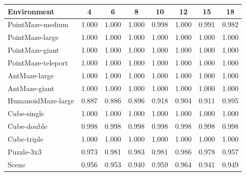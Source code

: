 \begin{tabular}{lccccccc}
\toprule
Environment & 4 & 6 & 8 & 10 & 12 & 15 & 18\\
\midrule
PointMaze-medium & 1.000 & 1.000 & 1.000 & 0.998 & 1.000 & 0.991 & 0.982\\
PointMaze-large & 1.000 & 1.000 & 1.000 & 1.000 & 1.000 & 1.000 & 1.000\\
PointMaze-giant & 1.000 & 1.000 & 1.000 & 1.000 & 1.000 & 1.000 & 1.000\\
PointMaze-teleport & 1.000 & 1.000 & 1.000 & 1.000 & 1.000 & 1.000 & 1.000\\
AntMaze-large & 1.000 & 1.000 & 1.000 & 1.000 & 1.000 & 1.000 & 1.000\\
AntMaze-giant & 1.000 & 1.000 & 1.000 & 1.000 & 1.000 & 1.000 & 1.000\\
HumanoidMaze-large & 0.887 & 0.886 & 0.896 & 0.918 & 0.904 & 0.911 & 0.895\\
Cube-single & 1.000 & 1.000 & 1.000 & 1.000 & 1.000 & 1.000 & 1.000\\
Cube-double & 0.998 & 0.998 & 0.998 & 0.998 & 0.998 & 0.998 & 0.998\\
Cube-triple & 1.000 & 1.000 & 1.000 & 1.000 & 1.000 & 1.000 & 1.000\\
Puzzle-3x3 & 0.973 & 0.981 & 0.983 & 0.981 & 0.986 & 0.978 & 0.957\\
Scene & 0.956 & 0.953 & 0.940 & 0.959 & 0.964 & 0.941 & 0.949\\
\bottomrule
\end{tabular}
